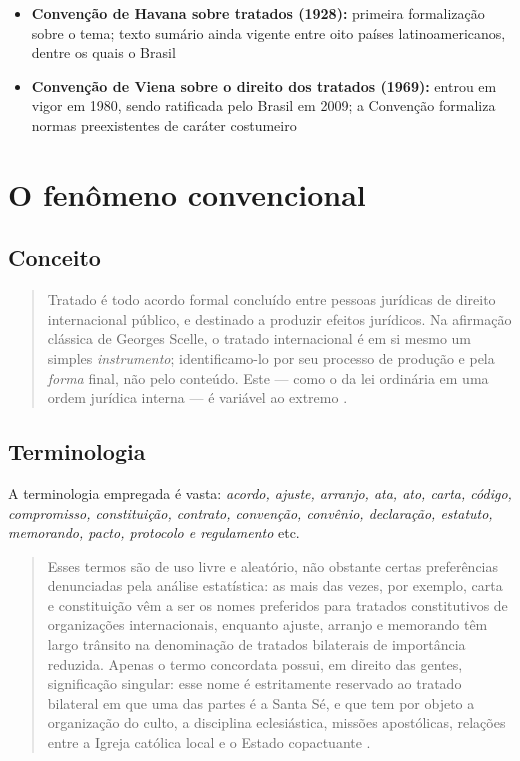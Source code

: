 \documentclass{article}
\begin{document}
\begin{itemize}
    \item \textbf{Convenção de Havana sobre tratados (1928):} primeira formalização sobre o tema; texto sumário ainda vigente entre oito países latinoamericanos, dentre os quais o Brasil
    \item \textbf{Convenção de Viena sobre o direito dos tratados (1969):} entrou em vigor em 1980, sendo ratificada pelo Brasil em 2009; a Convenção formaliza normas preexistentes de caráter costumeiro
\end{itemize}

\section{O fenômeno convencional}

\subsection{Conceito}

\begin{quote}
    Tratado é todo acordo formal concluído entre pessoas jurídicas de direito internacional público, e destinado a produzir efeitos jurídicos. Na afirmação clássica de Georges Scelle, o tratado internacional é em si mesmo um simples \textit{instrumento}; identificamo-lo por seu processo de produção e pela \textit{forma} final, não pelo conteúdo. Este — como o da lei ordinária em uma ordem jurídica interna — é variável ao extremo \cite[p.~12]{rezek_direito_2024}.
\end{quote}

\subsection{Terminologia}

A terminologia empregada é vasta: \textit{acordo, ajuste, arranjo, ata, ato, carta, código, compromisso, constituição, contrato, convenção, convênio, declaração, estatuto, memorando, pacto, protocolo e regulamento} etc.

\begin{quote}
    Esses termos são de uso livre e aleatório, não obstante certas preferências denunciadas pela análise estatística: as mais das vezes, por exemplo, carta e constituição vêm a ser os nomes preferidos para tratados constitutivos de organizações internacionais, enquanto ajuste, arranjo e memorando têm largo trânsito na denominação de tratados bilaterais de importância reduzida. Apenas o termo concordata possui, em direito das gentes, significação singular: esse nome é estritamente reservado ao tratado bilateral em que uma das partes é a Santa Sé, e que tem por objeto a organização do culto, a disciplina eclesiástica, missões apostólicas, relações entre a Igreja católica local e o Estado copactuante \cite[p.~13]{rezek_direito_2024}.
\end{quote}
\end{document}
